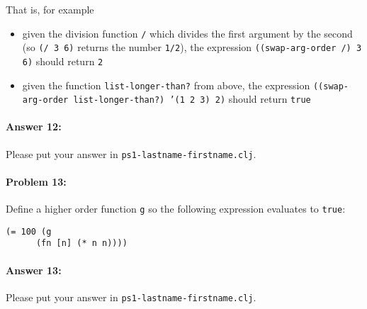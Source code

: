 \documentclass[10pt]{article}
\newcommand{\PSnum}{1}
\begin{document}
That is, for example
\begin{itemize}[nosep]
  \item given the division function \texttt{/} which divides the first argument
    by the second (so \texttt{(/ 3 6)} returns the number \texttt{1/2}), the
    expression \texttt{((swap-arg-order /) 3 6)} should return \texttt{2}
  \item given the function \texttt{list-longer-than?} from above, the
    expression \texttt{((swap-arg-order list-longer-than?) '(1 2 3) 2)} should
    return \texttt{true}
\end{itemize}
\paragraph{Answer 12:} Please put your answer in \texttt{ps\PSnum-lastname-firstname.clj}.

\noindent\hrulefill%

\paragraph{Problem 13:}
Define a higher order function \texttt{g} so the following expression evaluates to \texttt{true}:
\begin{lstlisting}
(= 100 (g
      (fn [n] (* n n))))
\end{lstlisting}

\paragraph{Answer 13:} Please put your answer in \texttt{ps\PSnum-lastname-firstname.clj}.

\noindent\hrulefill%
\end{document}
